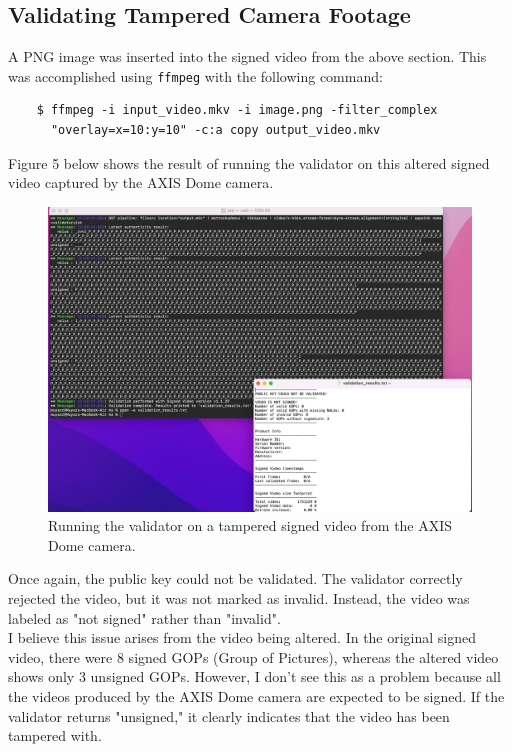 \documentclass[a4paper,12pt]{article}
\begin{document}
\subsection{Validating Tampered Camera Footage}

A PNG image was inserted into the signed video from the above section. This was accomplished using \texttt{ffmpeg} with the following command:

\begin{verbatim}
    $ ffmpeg -i input_video.mkv -i image.png -filter_complex 
      "overlay=x=10:y=10" -c:a copy output_video.mkv
\end{verbatim}

Figure 5 below shows the result of running the validator on this altered signed video captured by the AXIS Dome camera.

\begin{figure}[h!]
    \centering
    \includegraphics[width=1\textwidth]{pic1.jpg}
    \caption{Running the validator on a tampered signed video from the AXIS Dome camera.}
    \label{fig:axis-dome-example}
\end{figure}

Once again, the public key could not be validated. The validator correctly rejected the video, but it was not marked as invalid. Instead, the video was labeled as "not signed" rather than "invalid". \\ 

I believe this issue arises from the video being altered. In the original signed video, there were 8 signed GOPs (Group of Pictures), whereas the altered video shows only 3 unsigned GOPs. However, I don't see this as a problem because all the videos produced by the AXIS Dome camera are expected to be signed. If the validator returns "unsigned," it clearly indicates that the video has been tampered with.
\end{document}
